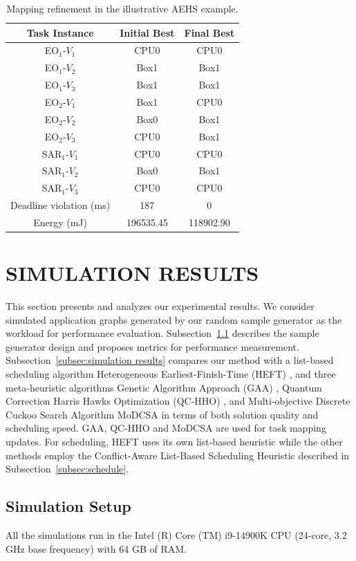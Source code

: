 \documentclass{IEEEtaes}
\begin{document}
\begin{table}[!t]
\centering
\caption{Mapping refinement in the illustrative AEHS example.}
\label{tab:illustrative_mapping}
\begin{tabular}{c|cc}
\hline
\textbf{Task Instance} & \textbf{Initial Best} & \textbf{Final Best} \\ \hline
EO$_1$-$V_1$  & CPU0  & CPU0  \\
EO$_1$-$V_2$  & Box1  & Box1  \\
EO$_1$-$V_3$  & Box1  & Box1  \\
EO$_2$-$V_1$  & Box1  & CPU0  \\
EO$_2$-$V_2$  & Box0  & Box1  \\
EO$_2$-$V_3$  & CPU0  & Box1  \\
SAR$_1$-$V_1$ & CPU0  & CPU0  \\
SAR$_1$-$V_2$ & Box0  & Box1  \\
SAR$_1$-$V_3$ & CPU0  & CPU0  \\ \hline
Deadline violation (ms) & 187 & 0 \\
Energy (mJ) & 196535.45 & 118902.90 \\ \hline
\end{tabular}
\end{table}

\section{SIMULATION RESULTS}
\label{sec:sim}
This section presents and analyzes our experimental results. We consider simulated application graphs generated by our random sample generator as the workload for performance evaluation. Subsection~\ref{subsec:simulation set} describes the sample generator design and proposes metrics for performance measurement. Subsection~\ref{subsec:simulation results} compares our method with a list-based scheduling algorithm Heterogeneous Earliest-Finish-Time (HEFT) \cite{b13}, and three meta-heuristic algorithms Genetic Algorithm Approach (GAA) \cite{b14}, Quantum Correction Harris Hawks Optimization (QC-HHO) \cite{b15}, and Multi-objective Discrete Cuckoo Search Algorithm MoDCSA\cite{b37} in terms of both solution quality and scheduling speed. GAA, QC-HHO and MoDCSA are used for task mapping updates. For scheduling, HEFT uses its own list-based heuristic while the other methods employ the Conflict-Aware List-Based Scheduling Heuristic described in Subsection~\ref{subsec:schedule}.

\subsection{Simulation Setup}
\label{subsec:simulation set}
All the simulations run in the Intel (R) Core (TM) i9-14900K CPU (24-core, 3.2 GHz base frequency) with 64 GB of RAM.
\end{document}
